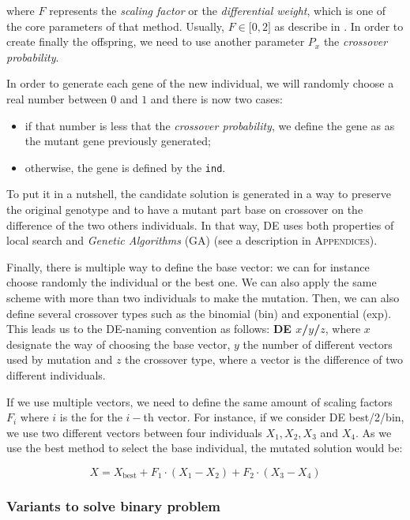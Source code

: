 \documentclass[12pt, openany]{article}
\begin{document}
where $F$ represents the \emph{scaling factor} or the \emph{differential weight}, which is one of the core parameters of that method. Usually, $F\in \lbrack 0,2\rbrack$ as describe in \cite{przewozniczek_de}. In order to create finally the offspring, we need to use another parameter $P_x$ the \emph{crossover probability}.

In order to generate each gene of the new individual, we will randomly choose a real number between $0$ and $1$ and there is now two cases:

\begin{itemize}
    \item if that number is less that the \emph{crossover probability}, we define the gene as as the mutant gene previously generated;
    \item otherwise, the gene is defined by the \texttt{ind}.
\end{itemize}

To put it in a nutshell, the candidate solution is generated in a way to preserve the original genotype and to have a mutant part base on crossover on the difference of the two others individuals. In that way, DE uses both properties of local search and \emph{Genetic Algorithms} (GA) (see a description in \textsc{Appendices}).

Finally, there is multiple way to define the base vector: we can for instance choose randomly the individual or the best one. We can also apply the same scheme with more than two individuals to make the mutation. Then, we can also define several crossover types such as the binomial (bin) and exponential (exp). This leads us to the DE-naming convention as follows: \textbf{DE $x$/$y$/$z$}, where $x$ designate the way of choosing the base vector, $y$ the number of different vectors used by mutation and $z$ the crossover type, where a vector is the difference of two different individuals.

If we use multiple vectors, we need to define the same amount of scaling factors $F_i$ where $i$ is the for the $i-$th vector. For instance, if we consider DE best/2/bin, we use two different vectors between four individuals $X_1, X_2,X_3$ and $X_4$. As we use the best method to select the base individual, the mutated solution would be:

\begin{equation*}
    X = X_{\text{best}} + F_1 \cdot (X_1 - X_2) + F_2\cdot (X_3 - X_4)
\end{equation*}

\subsubsection{Variants to solve binary problem}\label{sec:bde}
\end{document}
